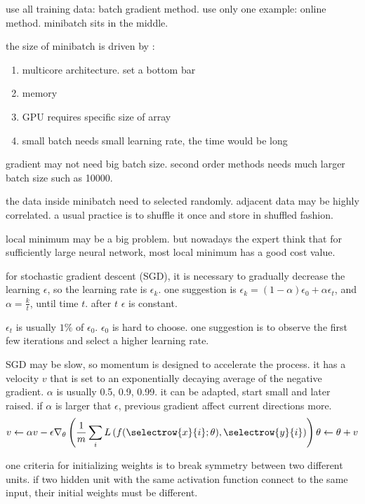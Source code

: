 use all training data: batch gradient method. use only one example: online method. minibatch sits in the middle.

the size of minibatch is driven by :
\begin{enumerate}
    \item multicore architecture. set a bottom bar
    \item memory
    \item GPU requires specific size of array
    \item small batch needs small learning rate, the time would be long
\end{enumerate}


gradient may not need big batch size. second order methods needs much larger batch size such as 10000.

the data inside minibatch need to selected randomly. adjacent data may be highly correlated. a usual practice is to shuffle it once and store in shuffled fashion.

local minimum may be a big problem. but nowadays the expert think that for sufficiently large neural network, most local minimum has a good cost value.

for stochastic gradient descent (SGD), it is necessary to gradually decrease the learning $\epsilon$, so the learning rate is $\epsilon_k$. one suggestion is $\epsilon_k = (1-\alpha)\epsilon_0 + \alpha \epsilon_t$, and $\alpha = \frac{k}{t}$, until time $t$. after $t$ $\epsilon$ is constant. 

$\epsilon_t$ is usually $1\%$ of $\epsilon_0$. $\epsilon_0$ is hard to choose. one suggestion is to observe the first few iterations and select a higher learning rate. 

SGD may be slow, so momentum is designed to accelerate the process. it has a velocity $v$ that is set to an exponentially decaying average of the negative gradient. $\alpha$ is usually 0.5, 0.9, 0.99. it can be adapted, start small and later raised. if $\alpha$ is larger that $\epsilon$, previous gradient affect current directions more.
\begin{equation}
    v \leftarrow \alpha v - \epsilon \nabla_\theta \left(\frac{1}{m} \sum_i L\left(f(\selectrow{x}{i} ;\theta), \selectrow{y}{i}\right) \right) \\
    \theta \leftarrow \theta + v
\end{equation}

one criteria for initializing weights is to break symmetry between two different units. if two hidden unit with the same activation function connect to the same input, their initial weights must be different.

